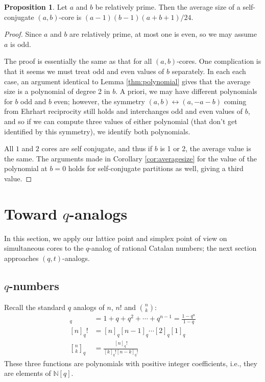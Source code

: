 \documentclass{amsart}[12pt]
\theoremstyle{definition}
\newtheorem{proposition}[dummy]{Proposition}
\newcommand{\N}{\mathbb{N}}
\begin{document}
\begin{proposition} \label{prop:conjugatesize}
Let $a$ and $b$ be relatively prime.  Then the average size of a self-conjugate $(a,b)$-core is $(a-1)(b-1)(a+b+1)/24$.
\end{proposition}


\begin{proof}

Since $a$ and $b$ are relatively prime, at most one is even, so we may assume $a$ is odd.  

The proof is essentially the same as that for all $(a,b)$-cores.  One complication is that it seems we must treat odd and even values of $b$ separately.   In each each case, an argument identical to Lemma \ref{thm:polynomial} gives that the average size is a polynomial of degree 2 in $b$.  A priori, we may have different polynomials for $b$ odd and $b$ even; however, the symmetry $(a,b)\leftrightarrow (a, -a-b)$ coming from Ehrhart reciprocity still holds and interchanges odd and even values of $b$, and so if we can compute three values of either polynomial (that don't get identified by this symmetry), we identify both polynomials.

All $1$ and $2$ cores are self conjugate, and thus if $b$ is 1 or 2, the average value is the same.  The arguments made in Corollary \ref{cor:averagesize} for the value of the polynomial at $b=0$ holds for self-conjugate partitions as well, giving a third value.
\end{proof}


\section{Toward \texorpdfstring{$q$}{q}-analogs} \label{sec:qcat}
In this section, we apply our lattice point and simplex point of view on simultaneous cores to the $q$-analog of rational Catalan numbers; the next section approaches $(q,t)$-analogs.

\subsection{\texorpdfstring{$q$}{q}-numbers}





Recall the standard $q$ analogs of $n$, $n!$ and $\binom{n}{k}$:
\begin{align*}
[n]_q&=1+q+q^2+\cdots+q^{n-1}=\frac{1-q^n}{1-q} \\
[n]_q!&=[n]_q[n-1]_q\cdots [2]_q[1]_q \\
{n \brack k}_q&=\frac{[n]_q!}{[k]_q![n-k]_q!}
\end{align*}
These three functions are polynomials with positive integer coefficients, i.e., they are elements of $\N[q]$.
\end{document}
